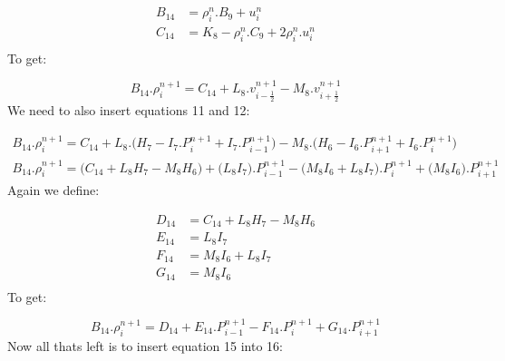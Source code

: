 \documentclass[11pt,letterpaper,titlepage]{article}
\newcommand{\half}{\frac{1}{2}}
\begin{document}
\begin{equation*}
\begin{aligned}
B_{14} &=  \rho_i^{n}.B_9+u_i^n \\
C_{14} &=   K_8 -\rho_i^{n}.C_9+2\rho_i^{n}.u_i^n  \\
\end{aligned}
\end{equation*}
\newline
To get:

\begin{equation*}
B_{14}.\rho_{i}^{n+1}=C_{14}+L_8.v_{i-\half}^{n+1}-M_8.v_{i+\half}^{n+1}
\end{equation*}
\newline
We need to also insert equations 11 and 12:

\begin{equation*}
\begin{aligned}
B_{14}.\rho_{i}^{n+1}=C_{14}+L_8.\biggr( H_7-I_7.P_{i}^{n+1}+I_7.P_{i-1}^{n+1}  \biggr)-M_8.\biggr( H_6-I_6.P_{i+1}^{n+1}+I_6.P_{i}^{n+1}   \biggr) \\
B_{14}.\rho_{i}^{n+1}=\biggr( C_{14}+L_8 H_7 -M_8 H_6 \biggr) + \biggr( L_8 I_7 \biggr).P_{i-1}^{n+1} - \biggr(M_8 I_6+L_8 I_7   \biggr).P_{i}^{n+1} + \biggr( M_8 I_6 \biggr).P_{i+1}^{n+1}
\end{aligned}
\end{equation*}
\newline
Again we define:

\begin{equation*}
\begin{aligned}
D_{14} &=  C_{14}+L_8 H_7 -M_8 H_6 \\
E_{14} &=  L_8 I_7  \\
F_{14} &=  M_8 I_6+L_8 I_7   \\
G_{14} &=  M_8 I_6  \\
\end{aligned}
\end{equation*}
\newline
To get:

\begin{equation}
B_{14}.\rho_{i}^{n+1}=D_{14} +E_{14}.P_{i-1}^{n+1} - F_{14}.P_{i}^{n+1} + G_{14}.P_{i+1}^{n+1}
\end{equation}
\newline
Now all thats left is to insert equation 15 into 16:
\end{document}
